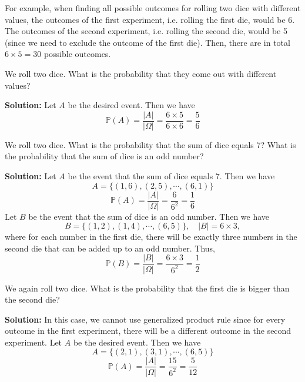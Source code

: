 For example, when finding all possible outcomes for rolling two dice with different values, the outcomes of the first experiment, i.e. rolling the first die, would be 6. The outcomes of the second experiment, i.e. rolling the second die, would be 5 (since we need to exclude the outcome of the first die). Then, there are in total \(6 \times 5 = 30\) possible outcomes. 

\begin{eg}
    We roll two dice. What is the probability that they come out with different values?
    
    \textbf{Solution:}
    Let \(A\) be the desired event. Then we have
    \[
        \mathbb{P}(A) = \dfrac{\vert A \vert}{\vert \Omega \vert} = \dfrac{6 \times 5}{6 \times 6} = \dfrac{5}{6}
    \]
\end{eg}

\begin{eg}
    We roll two dice. What is the probability that the sum of dice equals 7? What is the probability that the sum of dice is an odd number?

    \textbf{Solution: }
    Let \(A\) be the event that the sum of dice equals 7. Then we have
    \[
        A = \{(1, 6), (2, 5), \cdots, (6, 1)\}
    \]
    \[
        \mathbb{P}(A) = \dfrac{\vert A \vert }{\vert \Omega \vert } = \dfrac{6}{6^2} = \dfrac{1}{6}
    \]
    Let \(B\) be the event that the sum of dice is an odd number. Then we have
    \[
        B = \{(1, 2), (1, 4), \cdots, (6, 5)\},\quad \vert B \vert = 6 \times 3,
    \]
    where for each number in the first die, there will be exactly three numbers in the second die that can be added up to an odd number. Thus,
    \[
        \mathbb{P}(B) = \dfrac{\vert B \vert }{\vert \Omega \vert } = \dfrac{6 \times 3}{6^2} = \dfrac{1}{2}
    \]
\end{eg}

\begin{eg}
    We again roll two dice. What is the probability that the first die is bigger than the second die?

    \textbf{Solution: }
    In this case, we cannot use generalized product rule since for every outcome in the first experiment, there will be a different outcome in the second experiment. Let \(A\) be the desired event. Then we have 
    \[
        A = \{(2, 1), (3, 1), \cdots, (6, 5)\}
    \]
    \[
        \mathbb{P}(A) = \dfrac{\vert A \vert }{\vert \Omega \vert } = \dfrac{15}{6^2} = \dfrac{5}{12}
    \]
\end{eg}

